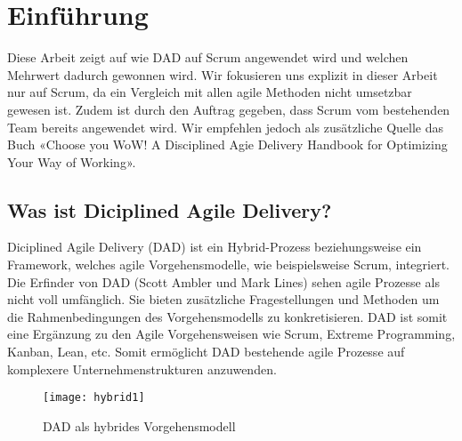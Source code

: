 
\chapter{Einführung}
\thispagestyle{fancy}
Diese Arbeit zeigt auf wie DAD auf Scrum angewendet wird und welchen Mehrwert dadurch gewonnen wird. Wir fokusieren uns explizit in dieser Arbeit nur auf Scrum, da ein Vergleich mit allen agile Methoden nicht umsetzbar gewesen ist. Zudem ist durch den Auftrag gegeben, dass Scrum vom bestehenden Team bereits angewendet wird.\smallskip
Wir empfehlen jedoch als zusätzliche Quelle das Buch «Choose you WoW! A Disciplined Agie Delivery Handbook for Optimizing Your Way of Working». %

\section{Was ist Diciplined Agile Delivery?}

Diciplined Agile Delivery (DAD) ist ein Hybrid-Prozess beziehungsweise ein Framework, welches agile Vorgehensmodelle, wie beispielsweise Scrum, integriert. Die Erfinder von DAD (Scott Ambler und Mark Lines) sehen agile Prozesse als nicht voll umfänglich. Sie bieten zusätzliche Fragestellungen und Methoden um die Rahmenbedingungen des Vorgehensmodells zu konkretisieren. DAD ist somit eine Ergänzung zu den Agile Vorgehensweisen wie Scrum, Extreme Programming, Kanban, Lean, etc. Somit ermöglicht DAD bestehende agile Prozesse auf komplexere Unternehmenstrukturen anzuwenden.\newline

\begin{figure}[H]
	\centering
	\texttt{[image: hybrid1]}
	\caption{DAD als hybrides Vorgehensmodell}
	\label{fig:hybrid}
\end{figure}
